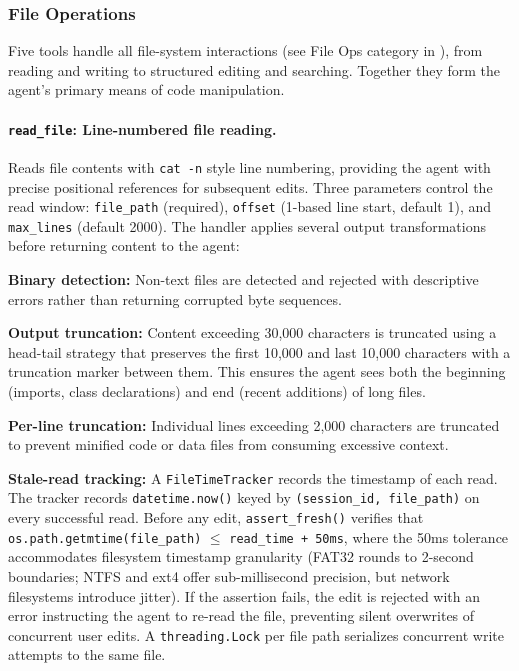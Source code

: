 \subsubsection{File Operations}
\label{sec:file_ops}

Five tools handle all file-system interactions (see File Ops category in ), from reading and writing to structured editing and searching. Together they form the agent's primary means of code manipulation.

\paragraph{\texttt{read\_file}: Line-numbered file reading.} Reads file contents with \texttt{cat -n} style line numbering, providing the agent with precise positional references for subsequent edits. Three parameters control the read window: \texttt{file\_path} (required), \texttt{offset} (1-based line start, default 1), and \texttt{max\_lines} (default 2000). The handler applies several output transformations before returning content to the agent:

\begin{packeditemize}
\item \textbf{Binary detection:} Non-text files are detected and rejected with descriptive errors rather than returning corrupted byte sequences.
\item \textbf{Output truncation:} Content exceeding 30,000 characters is truncated using a head-tail strategy that preserves the first 10,000 and last 10,000 characters with a truncation marker between them. This ensures the agent sees both the beginning (imports, class declarations) and end (recent additions) of long files.
\item \textbf{Per-line truncation:} Individual lines exceeding 2,000 characters are truncated to prevent minified code or data files from consuming excessive context.
\item \textbf{Stale-read tracking:} A \texttt{FileTimeTracker} records the timestamp of each read. The tracker records \texttt{datetime.now()} keyed by \texttt{(session\_id, file\_path)} on every successful read. Before any edit, \texttt{assert\_fresh()} verifies that \texttt{os.path.getmtime(file\_path)} $\leq$ \texttt{read\_time + 50ms}, where the 50ms tolerance accommodates filesystem timestamp granularity (FAT32 rounds to 2-second boundaries; NTFS and ext4 offer sub-millisecond precision, but network filesystems introduce jitter). If the assertion fails, the edit is rejected with an error instructing the agent to re-read the file, preventing silent overwrites of concurrent user edits. A \texttt{threading.Lock} per file path serializes concurrent write attempts to the same file.
\end{packeditemize}

